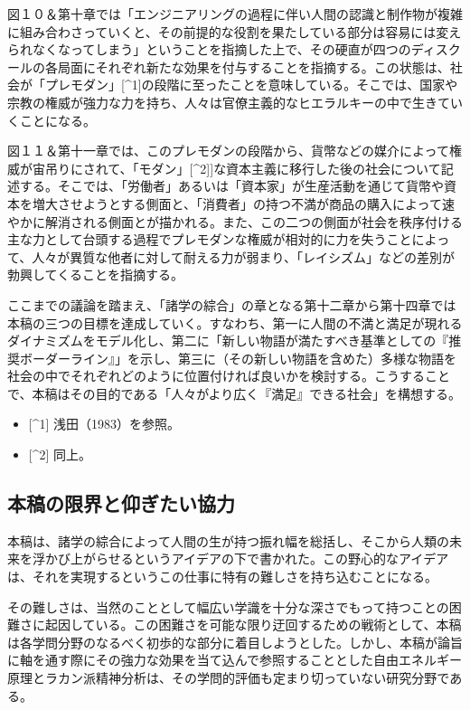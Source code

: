 図１０＆第十章では「エンジニアリングの過程に伴い人間の認識と制作物が複雑に組み合わさっていくと、その前提的な役割を果たしている部分は容易には変えられなくなってしまう」ということを指摘した上で、その硬直が四つのディスクールの各局面にそれぞれ新たな効果を付与することを指摘する。この状態は、社会が「プレモダン」{[}\^{}1{]}の段階に至ったことを意味している。そこでは、国家や宗教の権威が強力な力を持ち、人々は官僚主義的なヒエラルキーの中で生きていくことになる。

図１１＆第十一章では、このプレモダンの段階から、貨幣などの媒介によって権威が宙吊りにされて、「モダン」{[}\^{}2{]}{]}な資本主義に移行した後の社会について記述する。そこでは、「労働者」あるいは「資本家」が生産活動を通じて貨幣や資本を増大させようとする側面と、「消費者」の持つ不満が商品の購入によって速やかに解消される側面とが描かれる。また、この二つの側面が社会を秩序付ける主な力として台頭する過程でプレモダンな権威が相対的に力を失うことによって、人々が異質な他者に対して耐える力が弱まり、「レイシズム」などの差別が勃興してくることを指摘する。

ここまでの議論を踏まえ、「諸学の綜合」の章となる第十二章から第十四章では本稿の三つの目標を達成していく。すなわち、第一に人間の不満と満足が現れるダイナミズムをモデル化し、第二に「新しい物語が満たすべき基準としての『推奨ボーダーライン』」を示し、第三に（その新しい物語を含めた）多様な物語を社会の中でそれぞれどのように位置付ければ良いかを検討する。こうすることで、本稿はその目的である「人々がより広く『満足』できる社会」を構想する。

\begin{itemize}
\tightlist
\item
  {[}\^{}1{]} 浅田（1983）を参照。
\item
  {[}\^{}2{]} 同上。
\end{itemize}

\subsection{本稿の限界と仰ぎたい協力}\label{ux672cux7a3fux306eux9650ux754cux3068ux4ef0ux304eux305fux3044ux5354ux529b}

本稿は、諸学の綜合によって人間の生が持つ振れ幅を総括し、そこから人類の未来を浮かび上がらせるというアイデアの下で書かれた。この野心的なアイデアは、それを実現するというこの仕事に特有の難しさを持ち込むことになる。

その難しさは、当然のこととして幅広い学識を十分な深さでもって持つことの困難さに起因している。この困難さを可能な限り迂回するための戦術として、本稿は各学問分野のなるべく初歩的な部分に着目しようとした。しかし、本稿が論旨に軸を通す際にその強力な効果を当て込んで参照することとした自由エネルギー原理とラカン派精神分析は、その学問的評価も定まり切っていない研究分野である。

